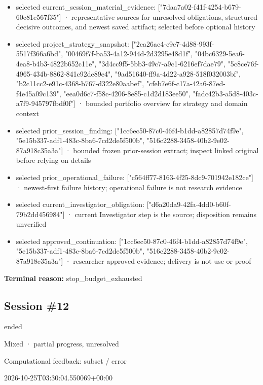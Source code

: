 \documentclass[11pt]{article}
\begin{document}
\begin{itemize}
\item selected current\_session\_material\_evidence: ["7daa7a02-f41f-4254-b679-60c81e567f35"] · representative sources for unresolved obligations, structured decisive outcomes, and newest saved artifact; selected before optional history
\item selected project\_strategy\_snapshot: ["2ca26ac4-c9e7-4d88-993f-5517f366a6bd", "00469f7f-ba53-4a12-944d-2d3295e48d1f", "04bc6329-5ea6-4ea8-b4b3-4822b652c11e", "3d4cc9f5-5bb3-49c7-a9c1-6216ef7dae79", "5c8ce76f-4965-434b-8862-841c92de89e4", "9ad51640-ff9a-4d22-a928-518f032003bf", "b2c11cc2-e91c-4368-b767-d322e80aabef", "cfeb7e6f-c17a-42a6-87ed-f4e45a09c139", "eea0d6c7-f58c-4206-8e85-c1d2d183ee50", "fadc42b3-a5d8-403c-a7f9-945797fbdf0f"] · bounded portfolio overview for strategy and domain context
\item selected prior\_session\_finding: ["1cc6ec50-87c0-46f4-b1dd-a82857d74f9e", "5e15b337-adf1-483c-8ba6-7cd2de5f500b", "516c2288-3458-40b2-9e02-87a918c35a3a"] · bounded frozen prior-session extract; inspect linked original before relying on details
\item selected prior\_operational\_failure: ["c564ff77-8163-4f25-8dc9-701942e182ce"] · newest-first failure history; operational failure is not research evidence
\item selected current\_investigator\_obligation: ["d6a20da9-42fa-4dd0-b60f-79b2dd456984"] · current Investigator step is the source; disposition remains unverified
\item selected approved\_continuation: ["1cc6ec50-87c0-46f4-b1dd-a82857d74f9e", "5e15b337-adf1-483c-8ba6-7cd2de5f500b", "516c2288-3458-40b2-9e02-87a918c35a3a"] · researcher-approved evidence; delivery is not use or proof
\end{itemize}
\textbf{Terminal reason:} stop\_budget\_exhausted\par
\subsection{Session \#12}
\begin{description}[style=nextline,font=\normalfont\bfseries,leftmargin=0pt,labelsep=0pt]
\item[Execution status] ended
\item[Outcome] Mixed · partial progress, unresolved
\item[Strategy] Computational feedback: subset / error
\item[Started] 2026-10-25T03:30:04.550069+00:00
\end{description}
\end{document}
